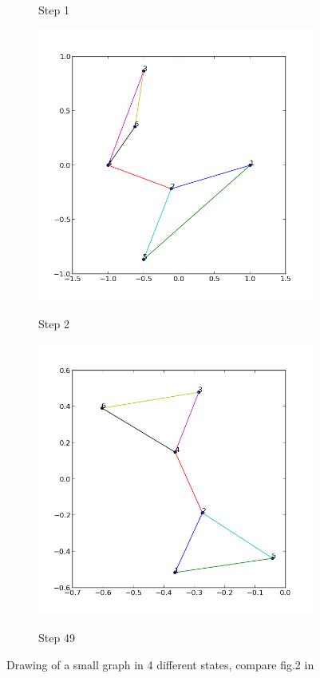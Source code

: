 \documentclass[12pt,a4paper]{article}
\begin{document}
\begin{figure}[htb]
\begin{subfigure}{.5\textwidth}
			\caption{Step 1}
			\end{subfigure}
			\begin{subfigure}{.5\textwidth}
			\centering
			\includegraphics[scale=0.4]{results_Kawai/ex1p2}\\
			\caption{Step 2}
			\end{subfigure}\hfill
			\begin{subfigure}{.5\textwidth}
			\centering
			\includegraphics[scale=0.4]{results_Kawai/ex1p49}\\
			\caption{Step 49}
			\end{subfigure}\hfill

		\caption{Drawing of a small graph in 4 different states, compare fig.2 in \cite{TomihisaKamada1989}}\label{fig: 1}
\end{figure}
\end{document}
